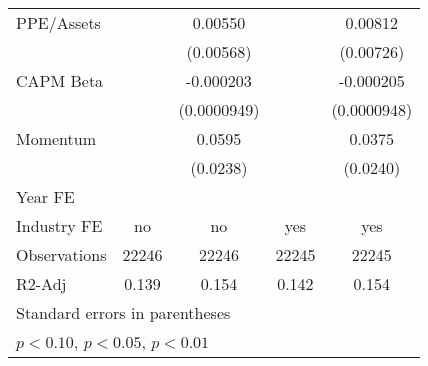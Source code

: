 {\begin{tabular}{l*{4}{c}}
PPE/Assets          &                     &     0.00550         &                     &     0.00812         \\
                    &                     &   (0.00568)         &                     &   (0.00726)         \\
CAPM Beta           &                     &   -0.000203\sym{**} &                     &   -0.000205\sym{**} \\
                    &                     & (0.0000949)         &                     & (0.0000948)         \\
Momentum            &                     &      0.0595\sym{**} &                     &      0.0375         \\
                    &                     &    (0.0238)         &                     &    (0.0240)         \\
\hline
Year FE             &                     &                     &                     &                     \\
Industry FE         &          no         &          no         &         yes         &         yes         \\
Observations        &       22246         &       22246         &       22245         &       22245         \\
R2-Adj              &       0.139         &       0.154         &       0.142         &       0.154         \\
\hline\hline
\multicolumn{5}{l}{\footnotesize Standard errors in parentheses}\\
\multicolumn{5}{l}{\footnotesize \sym{*} \(p<0.10\), \sym{**} \(p<0.05\), \sym{***} \(p<0.01\)}\\
\end{tabular}
}

